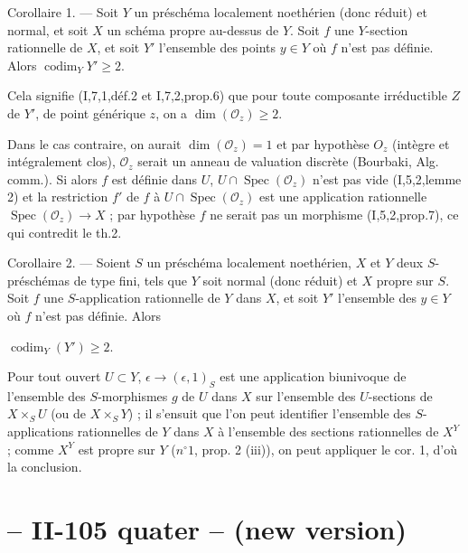 Corollaire 1. — Soit $Y$ un préschéma localement noethérien (donc réduit) et normal, et soit $X$ un schéma propre au-dessus de $Y$. Soit $f$ une $Y$-section rationnelle de $X$, et soit $Y'$ l'ensemble des points $y \in Y$ où $f$ n'est pas définie. Alors $\operatorname{codim}_Y Y' \ge 2$.

Cela signifie (I,7,1,déf.2 et I,7,2,prop.6) que pour toute composante irréductible $Z$ de $Y'$, de point générique $z$, on a $\dim(\mathcal{O}_z) \ge 2$.

Dans le cas contraire, on aurait $\dim(\mathcal{O}_z)=1$ et par hypothèse $O_z$ (intègre et intégralement clos), $\mathcal{O}_z$ serait un anneau de valuation discrète (Bourbaki, Alg. comm.). Si alors $f$ est définie dans $U$, $U \cap \operatorname{Spec}(\mathcal{O}_z)$ n'est pas vide (I,5,2,lemme 2) et la restriction $f'$ de $f$ à $U \cap \operatorname{Spec}(\mathcal{O}_z)$ est une application rationnelle $\operatorname{Spec}(\mathcal{O}_z) \to X$ ; par hypothèse $f$ ne serait pas un morphisme (I,5,2,prop.7), ce qui contredit le th.2.

Corollaire 2. — Soient $S$ un préschéma localement noethérien, $X$ et $Y$ deux $S$-préschémas de type fini, tels que $Y$ soit normal (donc réduit) et $X$ propre sur $S$. Soit $f$ une $S$-application rationnelle de $Y$ dans $X$, et soit $Y'$ l'ensemble des $y \in Y$ où $f$ n'est pas définie. Alors

\newpage


$\operatorname{codim}_Y(Y') \ge 2$.

Pour tout ouvert $U \subset Y$, $\epsilon \to (\epsilon, 1)_S$ est une application biunivoque de l'ensemble des $S$-morphismes $g$ de $U$ dans $X$ sur l'ensemble des $U$-sections de $X \times_S U$ (ou de $X \times_S Y$) ; il s'ensuit que l'on peut identifier l'ensemble des $S$-applications rationnelles de $Y$ dans $X$ à l'ensemble des sections rationnelles de $X^Y$ ; comme $X^Y$ est propre sur $Y$ ($n^\circ 1$, prop. 2 (iii)), on peut appliquer le cor. 1, d'où la conclusion.

\newpage



\section*{-- II-105 quater -- (new version)}

